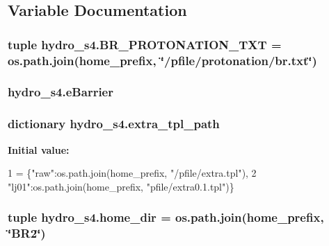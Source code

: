\subsection{Variable Documentation}
\hypertarget{namespacehydro__s4_a61fdb7e099159115ed2b24d53567f6fb}{
\subsubsection[{B\-R\-\_\-\-P\-R\-O\-T\-O\-N\-A\-T\-I\-O\-N\-\_\-\-T\-X\-T}]{\setlength{\rightskip}{0pt plus 5cm}tuple hydro\-\_\-s4.\-B\-R\-\_\-\-P\-R\-O\-T\-O\-N\-A\-T\-I\-O\-N\-\_\-\-T\-X\-T = os.\-path.\-join({\bf home\-\_\-prefix}, \char`\"{}/pfile/protonation/br.\-txt\char`\"{})}}\label{namespacehydro__s4_a61fdb7e099159115ed2b24d53567f6fb}
\hypertarget{namespacehydro__s4_a5dabbf08ce2cc9ec4f3fc0114ee8e56d}{
\subsubsection[{e\-Barrier}]{\setlength{\rightskip}{0pt plus 5cm}hydro\-\_\-s4.\-e\-Barrier}}\label{namespacehydro__s4_a5dabbf08ce2cc9ec4f3fc0114ee8e56d}
\hypertarget{namespacehydro__s4_a2afd7863dc3627b4c2aa6bed8f4c863e}{
\subsubsection[{extra\-\_\-tpl\-\_\-path}]{\setlength{\rightskip}{0pt plus 5cm}dictionary hydro\-\_\-s4.\-extra\-\_\-tpl\-\_\-path}}\label{namespacehydro__s4_a2afd7863dc3627b4c2aa6bed8f4c863e}
{\bfseries Initial value\-:}
\begin{DoxyCode}
1 = \{\textcolor{stringliteral}{"raw"}:os.path.join(home\_prefix, \textcolor{stringliteral}{"/pfile/extra.tpl"}),
2                   \textcolor{stringliteral}{"lj01"}:os.path.join(home\_prefix, \textcolor{stringliteral}{"pfile/extra0.1.tpl"})\}
\end{DoxyCode}
\hypertarget{namespacehydro__s4_aea511fc9c9b2aa6d76edbe787efc805f}{
\subsubsection[{home\-\_\-dir}]{\setlength{\rightskip}{0pt plus 5cm}tuple hydro\-\_\-s4.\-home\-\_\-dir = os.\-path.\-join({\bf home\-\_\-prefix}, \char`\"{}B\-R2\char`\"{})}}\label{namespacehydro__s4_aea511fc9c9b2aa6d76edbe787efc805f}
